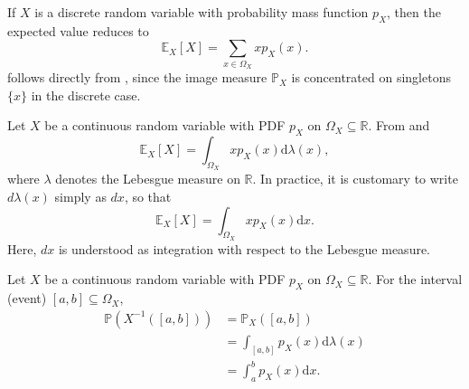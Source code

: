 \begin{remark}
	\label{rem:expected_value_discrete}
	If $X$ is a discrete random variable with probability mass function $p_X$, then the expected value reduces to
	\begin{equation}
		\mathbb{E}_X[X]=\sum_{x\in \Omega_X} x p_X(x).
		\label{eq:discrete_exp}
	\end{equation}
	 follows directly from , since the image measure $\mathbb{P}_X$ is concentrated on singletons $\{x\}$ in the discrete case.
\end{remark}

\begin{remark}
	\label{remark:expectation_continuous}
	Let $X$ be a continuous random variable with PDF $p_X$ on $\Omega_X \subseteq \mathbb{R}$. From  and 	
	\begin{equation}
		\mathbb{E}_X[X] = \int_{\Omega_X} x p_X(x) \mathrm{d}\lambda(x),
	\end{equation}
	where $\lambda$ denotes the Lebesgue measure on $\mathbb{R}$. In practice, it is customary to write $d\lambda(x)$ simply as $dx$, so that
	\begin{equation}
		\mathbb{E}_X[X] = \int_{\Omega_X} x p_X(x) \mathrm{d}x.
	\end{equation}
	Here, $dx$ is understood as integration with respect to the Lebesgue measure.
\end{remark}

\begin{example}
	Let $X$ be a continuous random variable with PDF $p_X$ on $\Omega_X\subseteq \mathbb{R}$. For the interval (event) $[a,b] \subseteq \Omega_X$,
	\begin{equation}
		\begin{split}
			\mathbb{P}(X^{-1}([a,b])) 
			&= \mathbb{P}_X([a,b])\\ 
			&= \int_{[a,b]} p_X(x) \mathrm{d}\lambda(x)\\ 
			&= \int_a^b p_X(x) \mathrm{d}x.
		\end{split}
	\end{equation}
\end{example}

